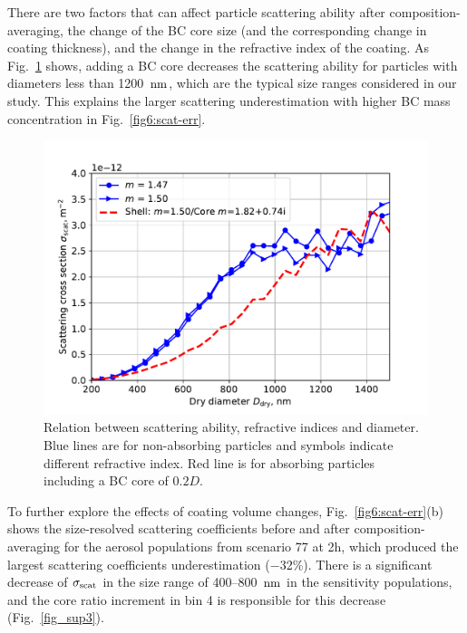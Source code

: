 \documentclass[edeposit,fullpage]{uiucthesis2009}
\makeatletter
\DeclareRobustCommand*\unit[1]
 {\ensuremath{%
   {\thinmuskip3mu\relax
    \def\mu{\text{\textmu}}\def~{\,}%
    \ifx\f@series\testbx\mathbf{#1}\else\mathrm{#1}\fi}}}
\makeatother
\begin{document}
There are two factors that can affect particle scattering ability
after composition-averaging, the change of the BC core size (and the
corresponding change in coating thickness), and the change in the
refractive index of the coating. As Fig.~\ref{fig8:scat-exp} shows,
adding a BC core decreases the scattering ability for particles with
diameters less than 1200~\unit{nm}, which are the typical size ranges
considered in our study. This explains the larger scattering
underestimation with higher BC mass concentration in
Fig.~\ref{fig6:scat-err}.

\begin{figure}
	\centering
	\includegraphics[scale=0.50]{chap4_figs/fig7.pdf}
	\caption{Relation between scattering ability, refractive
          indices and diameter. Blue lines are for non-absorbing
          particles and symbols indicate different refractive
          index. Red line is for absorbing particles including a BC
          core of $0.2D$.}
	\label{fig8:scat-exp}
\end{figure}

To further explore the effects of coating volume changes,
Fig.~\ref{fig6:scat-err}(b) shows the size-resolved scattering
coefficients before and after composition-averaging for the aerosol
populations from scenario 77 at 2h, which produced the largest
scattering coefficients underestimation ($-$32\%). There is a
significant decrease of $\sigma_{\rm scat}$ in the size range of
400--800~\unit{nm} in the sensitivity populations, and the core ratio
increment in bin 4 is responsible for this decrease
(Fig.~\ref{fig_sup3}).
\end{document}
